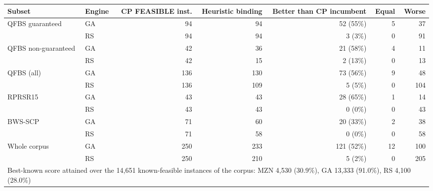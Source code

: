 \begin{tabular}{llrrrrr}
\toprule
Subset & Engine & CP FEASIBLE inst. & Heuristic binding & Better than CP incumbent & Equal & Worse \\
\midrule
QFBS guaranteed & GA & 94 & 94 & 52 (55\%) & 5 & 37 \\
 & RS & 94 & 94 & 3 (3\%) & 0 & 91 \\
QFBS non-guaranteed & GA & 42 & 36 & 21 (58\%) & 4 & 11 \\
 & RS & 42 & 15 & 2 (13\%) & 0 & 13 \\
QFBS (all) & GA & 136 & 130 & 73 (56\%) & 9 & 48 \\
 & RS & 136 & 109 & 5 (5\%) & 0 & 104 \\
RPRSR15 & GA & 43 & 43 & 28 (65\%) & 1 & 14 \\
 & RS & 43 & 43 & 0 (0\%) & 0 & 43 \\
BWS-SCP & GA & 71 & 60 & 20 (33\%) & 2 & 38 \\
 & RS & 71 & 58 & 0 (0\%) & 0 & 58 \\
Whole corpus & GA & 250 & 233 & 121 (52\%) & 12 & 100 \\
 & RS & 250 & 210 & 5 (2\%) & 0 & 205 \\
\midrule
\multicolumn{7}{l}{Best-known score attained over the 14,651 known-feasible instances of the corpus: MZN 4,530 (30.9\%), GA 13,333 (91.0\%), RS 4,100 (28.0\%)} \\
\bottomrule
\end{tabular}

